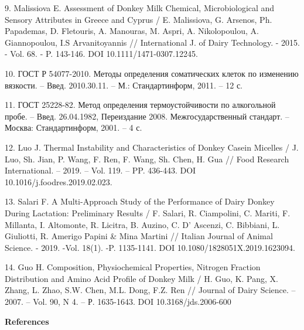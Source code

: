 \begin{noparindent}
9. Malissiova E. Assessment of Donkey Milk Chemical, Microbiological and
Sensory Attributes in Greece and Cyprus / E. Malissiova, G. Arsenos, Ph.
Papademas, D. Fletouris, A. Manouras, M. Aspri, A. Nikolopoulou, A.
Giannopoulou, I.S Arvanitoyannis // International J. of Dairy
Technology. - 2015. - Vol. 68. - P. 143-146. DOI
10.1111/1471-0307.12245.

10. ГОСТ Р 54077-2010. Методы определения соматических клеток по
изменению вязкости. -- Введ. 2010.30.11. -- М.: Стандартинформ, 2011. --
12 с.

11. ГОСТ 25228-82. Метод определения термоустойчивости по алкогольной
пробе. -- Введ. 26.04.1982, Переиздание 2008. Межгосударственный
стандарт. -- Москва: Стандартинформ, 2001. -- 4 с.

12. Luo J. Thermal Instability and Characteristics of Donkey Casein
Micelles / J. Luo, Sh. Jian, P. Wang, F. Ren, F. Wang, Sh. Chen, H. Gua
// Food Research International. -- 2019. -- Vol. 119. -- PP. 436-443.
DOI 10.1016/j.foodres.2019.02.023.

13. Salari F. A Multi-Approach Study of the Performance of Dairy Donkey
During Lactation: Preliminary Results / F. Salari, R. Ciampolini, C.
Mariti, F. Millanta, I. Altomonte, R. Licitra, B. Auzino, C. D' Ascenzi,
C. Bibbiani, L. Giuliotti, R. Amerigo Papini \& Mina Martini // Italian
Journal of Animal Science. - 2019. -Vol. 18(1). -P. 1135-1141. DOI
10.1080/1828051X.2019.1623094.

14. Guo H. Composition, Physiochemical Properties, Nitrogen Fraction
Distribution and Amino Acid Profile of Donkey Milk / H. Guo, K. Pang, X.
Zhang, L. Zhao, S.W. Chen, M.L. Dong, F.Z. Ren // Journal of Dairy
Science. -- 2007. -- Vol. 90, N 4. -- Р. 1635-1643. DOI
10.3168/jds.2006-600
\end{noparindent}

\begin{center}
{\bfseries References}
\end{center}

